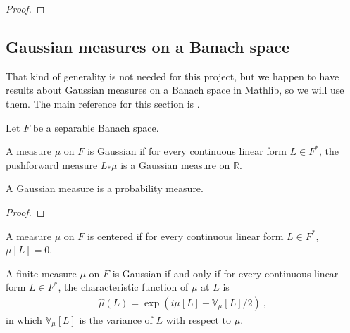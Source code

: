 \begin{proof}

\end{proof}


\subsection{Gaussian measures on a Banach space}

That kind of generality is not needed for this project, but we happen to have results about Gaussian measures on a Banach space in Mathlib, so we will use them.
The main reference for this section is \cite{hairer2009introduction}.

Let $F$ be a separable Banach space.

\begin{definition}\label{def:IsGaussian}
  \mathlibok
A measure $\mu$ on $F$ is Gaussian if for every continuous linear form $L \in F^*$, the pushforward measure $L_* \mu$ is a Gaussian measure on $\mathbb{R}$.
\end{definition}


\begin{lemma}\label{lem:IsGaussian.IsProbabilityMeasure}
  \mathlibok
A Gaussian measure is a probability measure.
\end{lemma}

\begin{proof}\leanok

\end{proof}


\begin{definition}\label{def:IsCentered}
A measure $\mu$ on $F$ is centered if for every continuous linear form $L \in F^*$, $\mu[L] = 0$.
\end{definition}


\begin{theorem}\label{thm:isGaussian_iff_charFunDual_eq}
  \mathlibok
A finite measure $\mu$ on $F$ is Gaussian if and only if for every continuous linear form $L \in F^*$, the characteristic function of $\mu$ at $L$ is
\begin{align*}
  \hat{\mu}(L) = \exp\left(i \mu[L] - \mathbb{V}_\mu[L] / 2\right) \: ,
\end{align*}
in which $\mathbb{V}_\mu[L]$ is the variance of $L$ with respect to $\mu$.
\end{theorem}

